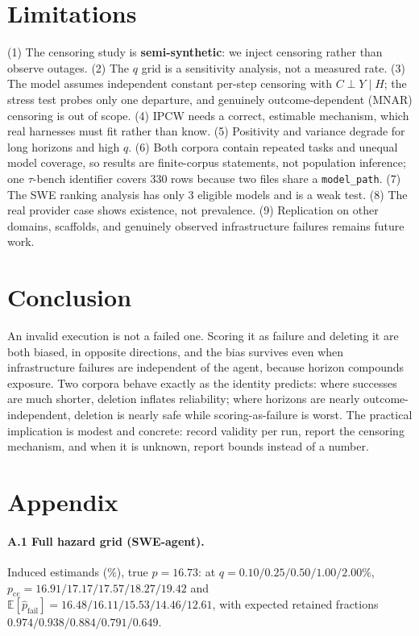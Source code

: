 \documentclass[letterpaper]{article}
\begin{document}
\section{Limitations}

(1) The censoring study is \textbf{semi-synthetic}: we inject censoring rather
than observe outages. (2) The $q$ grid is a sensitivity analysis, not a measured
rate. (3) The model assumes independent constant per-step censoring with
$C\perp Y\mid H$; the stress test probes only one departure, and genuinely
outcome-dependent (MNAR) censoring is out of scope. (4) IPCW needs a correct,
estimable mechanism, which real harnesses must fit rather than know.
(5) Positivity and variance degrade for long horizons and high $q$. (6) Both
corpora contain repeated tasks and unequal model coverage, so results are
finite-corpus statements, not population inference; one $\tau$-bench identifier
covers 330 rows because two files share a \texttt{model\_path}. (7) The SWE
ranking analysis has only 3 eligible models and is a weak test. (8) The real
provider case shows existence, not prevalence. (9) Replication on other domains,
scaffolds, and genuinely observed infrastructure failures remains future work.

\section{Conclusion}

An invalid execution is not a failed one. Scoring it as failure and deleting it
are both biased, in opposite directions, and the bias survives even when
infrastructure failures are independent of the agent, because horizon compounds
exposure. Two corpora behave exactly as the identity predicts: where successes
are much shorter, deletion inflates reliability; where horizons are nearly
outcome-independent, deletion is nearly safe while scoring-as-failure is
worst. The practical implication is modest and concrete: record validity per
run, report the censoring mechanism, and when it is unknown, report bounds
instead of a number.




\appendix
\section{Appendix}

\paragraph{A.1 Full hazard grid (SWE-agent).} Induced estimands (\%), true
$p=16.73$: at $q=0.10/0.25/0.50/1.00/2.00\%$, $p_{\mathrm{cc}}=
16.91/17.17/17.57/18.27/19.42$ and $\mathbb{E}[\hat p_{\mathrm{fail}}]=
16.48/16.11/15.53/14.46/12.61$, with expected retained fractions
$0.974/0.938/0.884/0.791/0.649$.
\end{document}

